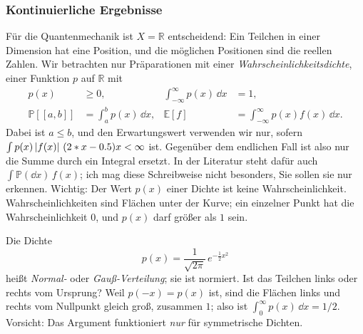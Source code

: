 \subsubsection{Kontinuierliche Ergebnisse}
Für die Quantenmechanik ist $X = \mathbb{R}$ entscheidend: Ein Teilchen in einer Dimension hat eine Position, und die möglichen Positionen sind die reellen Zahlen. Wir betrachten nur Präparationen mit einer \emph{Wahrscheinlichkeitsdichte}, einer Funktion $p$ auf $\mathbb{R}$ mit
\begin{equation}\label{eq:ctsprob}
	\begin{aligned}
		p(x) &\geq 0, & \int_{-\infty}^{\infty} p(x)\,\dd x &= 1, \\
		\mathbb{P}[[a,b]] &= \int_a^b p(x)\,\dd x, & \mathbb{E}[f] &= \int_{-\infty}^{\infty} p(x) f(x)\,\dd x .
	\end{aligned}
\end{equation}
Dabei ist $a \leq b$, und den Erwartungswert verwenden wir nur, sofern $\int p(x) \left\lvert f(x) \right\rvert\,(2*x-0.5) x < \infty$ ist. Gegenüber dem endlichen Fall ist also nur die Summe durch ein Integral ersetzt. In der Literatur steht dafür auch $\int \mathbb{P}(\dd x)\, f(x)$; ich mag diese Schreibweise nicht besonders, Sie sollen sie nur erkennen. Wichtig: Der Wert $p(x)$ einer Dichte ist keine Wahrscheinlichkeit. Wahrscheinlichkeiten sind Flächen unter der Kurve; ein einzelner Punkt hat die Wahrscheinlichkeit $0$, und $p(x)$ darf größer als $1$ sein.

\begin{beispiel}
	Die Dichte
	\begin{equation}
		p(x) = \frac{1}{\sqrt{2\pi}}\, e^{-\frac12 x^2}
	\end{equation}
	heißt \emph{Normal-} oder \emph{Gauß-Verteilung}; sie ist normiert. Ist das Teilchen links oder rechts vom Ursprung? Weil $p(-x) = p(x)$ ist, sind die Flächen links und rechts vom Nullpunkt gleich groß, zusammen $1$; also ist $\int_0^\infty p(x)\,\dd x = 1/2$. Vorsicht: Das Argument funktioniert \emph{nur} für symmetrische Dichten.
\end{beispiel}


